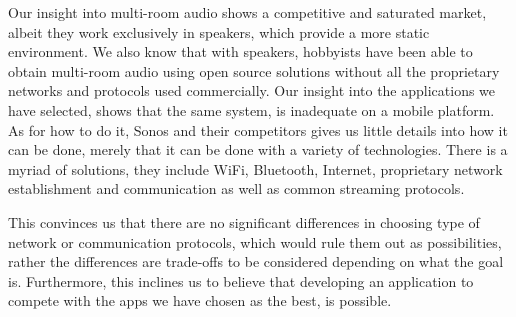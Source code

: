 \bigskip
Our insight into multi-room audio shows a competitive and saturated market, albeit they work exclusively in speakers, which provide a more static environment.
We also know that with speakers, hobbyists have been able to obtain multi-room audio using open source solutions without all the proprietary networks and protocols used commercially.
Our insight into the applications we have selected, shows that the same system, is inadequate on a mobile platform.
As for how to do it, Sonos and their competitors gives us little details into how it can be done, merely that it can be done with a variety of technologies.
There is a myriad of solutions, they include WiFi, Bluetooth, Internet, proprietary network establishment and communication as well as common streaming protocols.

This convinces us that there are no significant differences in choosing type of network or communication protocols, which would rule them out as possibilities, rather the differences are trade-offs to be considered depending on what the goal is.
Furthermore, this inclines us to believe that developing an application to compete with the apps we have chosen as the best, is possible.
